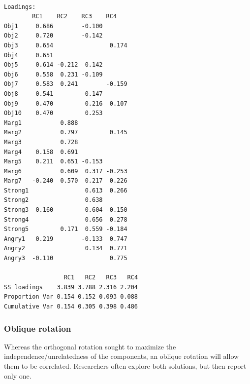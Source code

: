 \documentclass[
  english,
]{book}
\newenvironment{Shaded}{\begin{snugshade}}{\end{snugshade}}
\newcommand{\DataTypeTok}[1]{\textcolor[rgb]{0.13,0.29,0.53}{#1}}
\newcommand{\DecValTok}[1]{\textcolor[rgb]{0.00,0.00,0.81}{#1}}
\newcommand{\KeywordTok}[1]{\textcolor[rgb]{0.13,0.29,0.53}{\textbf{#1}}}
\newcommand{\NormalTok}[1]{#1}
\newcommand{\OperatorTok}[1]{\textcolor[rgb]{0.81,0.36,0.00}{\textbf{#1}}}
\newcommand{\OtherTok}[1]{\textcolor[rgb]{0.56,0.35,0.01}{#1}}
\newcommand{\StringTok}[1]{\textcolor[rgb]{0.31,0.60,0.02}{#1}}
\begin{document}
\begin{Shaded}
\end{Shaded}

\begin{verbatim}

Loadings:
        RC1    RC2    RC3    RC4   
Obj1     0.686        -0.100       
Obj2     0.720        -0.142       
Obj3     0.654                0.174
Obj4     0.651                     
Obj5     0.614 -0.212  0.142       
Obj6     0.558  0.231 -0.109       
Obj7     0.583  0.241        -0.159
Obj8     0.541         0.147       
Obj9     0.470         0.216  0.107
Obj10    0.470         0.253       
Marg1           0.888              
Marg2           0.797         0.145
Marg3           0.728              
Marg4    0.158  0.691              
Marg5    0.211  0.651 -0.153       
Marg6           0.609  0.317 -0.253
Marg7   -0.240  0.570  0.217  0.226
Strong1                0.613  0.266
Strong2                0.638       
Strong3  0.160         0.604 -0.150
Strong4                0.656  0.278
Strong5         0.171  0.559 -0.184
Angry1   0.219        -0.133  0.747
Angry2                 0.134  0.771
Angry3  -0.110                0.775

                 RC1   RC2   RC3   RC4
SS loadings    3.839 3.788 2.316 2.204
Proportion Var 0.154 0.152 0.093 0.088
Cumulative Var 0.154 0.305 0.398 0.486
\end{verbatim}

\hypertarget{oblique-rotation}{%
\subsubsection{Oblique rotation}\label{oblique-rotation}}

Whereas the orthogonal rotation sought to maximize the independence/unrelatedness of the components, an oblique rotation will allow them to be correlated. Researchers often explore both solutions, but then report only one.
\end{document}
